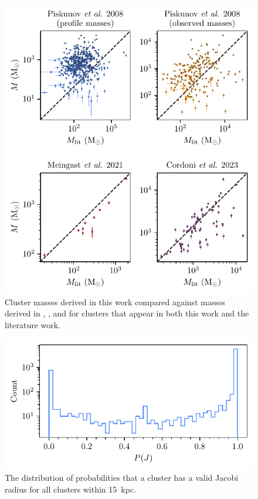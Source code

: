 \begin{figure}[p]
    \centering
    \includegraphics[width=\textwidth]{fig/c4/results_mass_comparison.pdf}
    \caption[Cluster masses derived in this work compared against masses derived in literature works.]{Cluster masses derived in this work compared against masses derived in \cite{piskunov_tidal_2008}, \cite{meingast_extended_2021}, and \cite{cordoni_photometric_binaries_2023} for clusters that appear in both this work and the literature work.}
    \label{fig:dynamics:results:mass_comparison}
\end{figure}

\begin{figure}[t]
    \centering
    \includegraphics[width=\textwidth]{fig/c4/results_p_jac_distribution.pdf}
    \caption[The distribution of probabilities that a cluster has a valid Jacobi radius]{The distribution of probabilities that a cluster has a valid Jacobi radius for all clusters within 15~kpc.}
    \label{fig:dynamics:results:jacobi_radii_distribution}
\end{figure}

